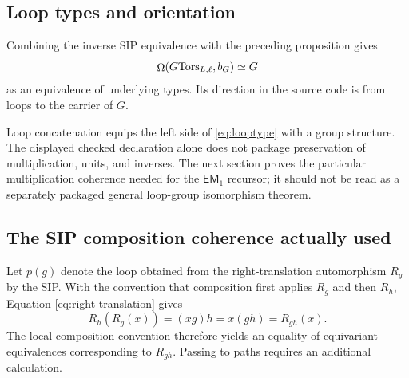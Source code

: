 
\subsection{Loop types and orientation}
Combining the inverse SIP equivalence with the preceding proposition gives
\begin{equation}
\mathop{\Omega}(G\mathrm{Tors}_{L,\ell},b_G)\simeq G
\label{eq:looptype}
\end{equation}
as an equivalence of underlying types. Its direction in the source code is from loops to the carrier of $G$.


\begin{warning}
Loop concatenation equips the left side of \eqref{eq:looptype} with a group structure. The displayed checked declaration alone does not package preservation of multiplication, units, and inverses. The next section proves the particular multiplication coherence needed for the $\mathsf{EM}_1$ recursor; it should not be read as a separately packaged general loop-group isomorphism theorem.
\end{warning}

\subsection{The SIP composition coherence actually used}
Let $p(g)$ denote the loop obtained from the right-translation automorphism $R_g$ by the SIP. With the convention that composition first applies $R_g$ and then $R_h$, Equation \eqref{eq:right-translation} gives
\begin{equation}
R_h(R_g(x))=(xg)h=x(gh)=R_{gh}(x).
\end{equation}
The local composition convention therefore yields an equality of equivariant equivalences corresponding to $R_{gh}$. Passing to paths requires an additional calculation.

